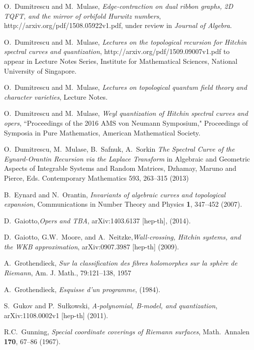 \documentclass[oneside, 11pt]{amsart}
\theoremstyle{definition}
\numberwithin{equation}{subsection}
\begin{document}
{\begin{thebibliography}{10}
 O.~Dumitrescu and M.~Mulase, {\it Edge-contraction on dual ribbon graphs, 2D TQFT, and the mirror of orbifold Hurwitz numbers},
http://arxiv.org/pdf/1508.05922v1.pdf, under review in {\it Journal of Algebra}.

 O.~Dumitrescu and M.~Mulase, {\it Lectures on the topological recursion for Hitchin spectral curves and quantization}, http://arxiv.org/pdf/1509.09007v1.pdf to appear in Lecture Notes Series, Institute for Mathematical Sciences, National University of Singapore.


 O.~Dumitrescu and M.~Mulase, \emph{Lectures on topological quantum field theory and character varieties}, Lecture Notes.

 O.~Dumitrescu and M.~Mulase, \emph{Weyl quantization of Hitchin spectral curves and opers}, ``Proceedings of the 2016  AMS von Neumann Symposium," Proceedings of Symposia in Pure Mathematics, American Mathematical Society. 

 O.~Dumitrescu, M.~Mulase, B.~Safnuk, A.~Sorkin {\it The Spectral Curve of the Eynard-Orantin Recursion via the Laplace Transform} in Algebraic and Geometric Aspects of Integrable Systems and Random Matrices, Dzhamay, Maruno and Pierce, Eds. Contemporary Mathematics 593, 263--315 (2013)

  B.~Eynard and N.~Orantin,
\emph{Invariants of algebraic curves and 
topological expansion},
Communications in Number Theory
and Physics {\bf 1},  347--452 (2007).

 D.~Gaiotto,\emph{Opers and TBA}, arXiv:1403.6137 [hep-th], (2014).

 D.~Gaiotto, G.W.~Moore, and A.~Neitzke,\emph{Wall-crossing, Hitchin systems, and the WKB approximation}, arXiv:0907.3987 [hep-th] (2009).		



 A.~Grothendieck,  \emph{Sur la classification des fibres holomorphes sur la sph\`ere de Riemann}, Am. J. Math., 79:121–138, 1957



A.~Grothendieck,
\emph{Esquisse d'un programme}, (1984).

 S.~Gukov and P.~Su\l kowski, \emph{A-polynomial, B-model, and quantization}, arXiv:1108.0002v1 [hep-th] (2011).

 R.C.~Gunning, \emph{Special coordinate coverings of Riemann surfaces}, Math.\ Annalen \textbf{170}, 67--86 (1967).



\end{thebibliography}}
\end{document}
